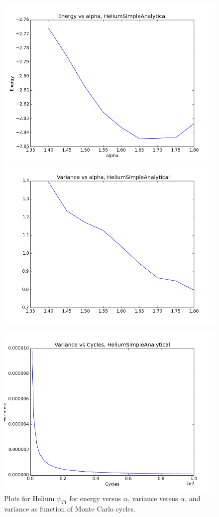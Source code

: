 \documentclass[11pt]{article}
\begin{document}
\begin{figure}
\centering \includegraphics[width=0.45\linewidth]{figures/EnergyVsAlphaHeliumSimpleAnalytical}
\includegraphics[width=0.45\linewidth]{figures/VarianceVsAlphaHeliumSimpleAnalytical}

\includegraphics[width=0.45\linewidth]{figures/VarianceNCyclesHeliumSimpleAnalytical}\protect\protect\caption{Plots for Helium $\psi_{T1}$ for energy versus $\alpha$, variance versus $\alpha$, and variance as function of Monte Carlo cycles.}
\label{fig01:alpha_Simple} 
\end{figure}
\end{document}
